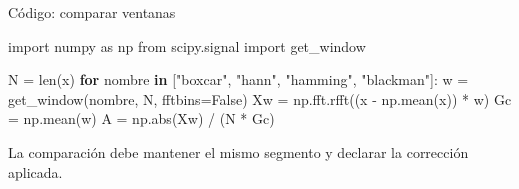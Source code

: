 \documentclass[
  ignorenonframetext,
  aspectratio=169,
  spanish,
]{beamer}
\newenvironment{Shaded}{\begin{snugshade}}{\end{snugshade}}
\newcommand{\BuiltInTok}[1]{\textcolor[rgb]{0.00,0.23,0.31}{#1}}
\newcommand{\ControlFlowTok}[1]{\textcolor[rgb]{0.00,0.23,0.31}{\textbf{#1}}}
\newcommand{\ImportTok}[1]{\textcolor[rgb]{0.00,0.46,0.62}{#1}}
\newcommand{\KeywordTok}[1]{\textcolor[rgb]{0.00,0.23,0.31}{\textbf{#1}}}
\newcommand{\NormalTok}[1]{\textcolor[rgb]{0.00,0.23,0.31}{#1}}
\newcommand{\OperatorTok}[1]{\textcolor[rgb]{0.37,0.37,0.37}{#1}}
\newcommand{\StringTok}[1]{\textcolor[rgb]{0.13,0.47,0.30}{#1}}
\newcommand{\VariableTok}[1]{\textcolor[rgb]{0.07,0.07,0.07}{#1}}
\begin{document}
\begin{frame}[fragile]{Código: comparar ventanas}
  \protect{}\label{cuxf3digo-comparar-ventanas}
  \begin{Shaded}
    \begin{Highlighting}[]
      \ImportTok{import}\NormalTok{ numpy }\ImportTok{as}\NormalTok{ np}
      \ImportTok{from}\NormalTok{ scipy.signal }\ImportTok{import}\NormalTok{ get\_window}

      \NormalTok{N }\OperatorTok{=} \BuiltInTok{len}\NormalTok{(x)}
      \ControlFlowTok{for}\NormalTok{ nombre }\KeywordTok{in}\NormalTok{ [}\StringTok{"boxcar"}\NormalTok{, }\StringTok{"hann"}\NormalTok{, }\StringTok{"hamming"}\NormalTok{, }\StringTok{"blackman"}\NormalTok{]:}
      \NormalTok{    w }\OperatorTok{=}\NormalTok{ get\_window(nombre, N, fftbins}\OperatorTok{=}\VariableTok{False}\NormalTok{)}
      \NormalTok{    Xw }\OperatorTok{=}\NormalTok{ np.fft.rfft((x }\OperatorTok{{-}}\NormalTok{ np.mean(x)) }\OperatorTok{*}\NormalTok{ w)}
      \NormalTok{    Gc }\OperatorTok{=}\NormalTok{ np.mean(w)}
      \NormalTok{    A }\OperatorTok{=}\NormalTok{ np.}\BuiltInTok{abs}\NormalTok{(Xw) }\OperatorTok{/}\NormalTok{ (N }\OperatorTok{*}\NormalTok{ Gc)}
    \end{Highlighting}
  \end{Shaded}

  \begin{tcolorbox}[enhanced jigsaw, arc=.35mm, bottomrule=.15mm, bottomtitle=1mm, breakable, colback=white, colbacktitle=quarto-callout-note-color!10!white, colframe=quarto-callout-note-color-frame, coltitle=black, left=2mm, leftrule=.75mm, opacityback=0, opacitybacktitle=0.6, rightrule=.15mm, title=\textcolor{quarto-callout-note-color}{\faInfo}\hspace{0.5em}{Nota}, titlerule=0mm, toprule=.15mm, toptitle=1mm]

    La comparación debe mantener el mismo segmento y declarar la corrección
    aplicada.

  \end{tcolorbox}
\end{frame}
\end{document}
